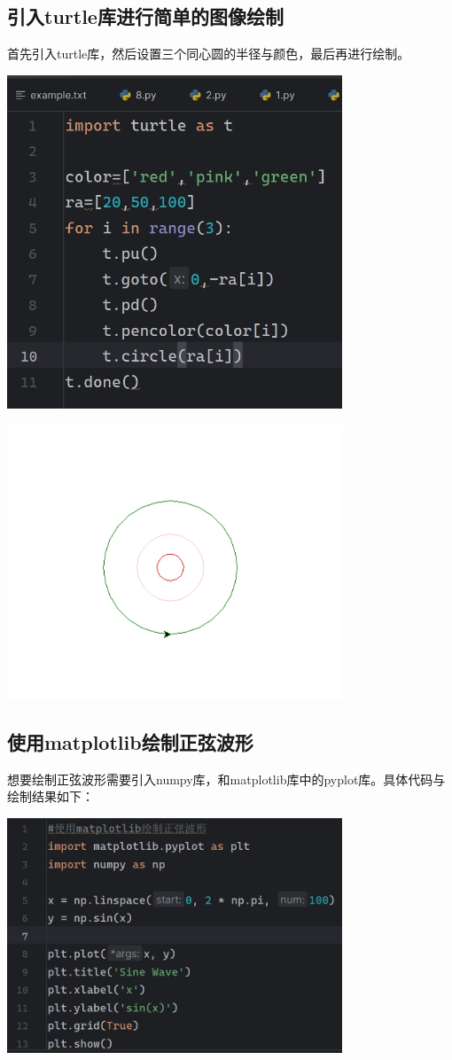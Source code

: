 \documentclass[UTF8,a4paper]{ctexart}
\begin{document}
\begin{sloppypar}
	\subsection{引入turtle库进行简单的图像绘制}
	首先引入turtle库，然后设置三个同心圆的半径与颜色，最后再进行绘制。
	
	\includegraphics[width = 10cm]{21.1}
	
	\includegraphics[width = 10cm]{21.2}
	
	\subsection{使用matplotlib绘制正弦波形}
	想要绘制正弦波形需要引入numpy库，和matplotlib库中的pyplot库。具体代码与绘制结果如下：
	
	\includegraphics[width = 10cm]{22.1}
	

\end{sloppypar}
\end{document}
